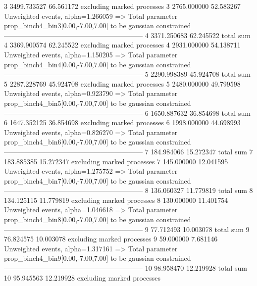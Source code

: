 3          3499.733527     66.561172       excluding marked processes    
3          2765.000000     52.583267       Unweighted events, alpha=1.266059
  => Total parameter prop_binch4_bin3[0.00,-7.00,7.00] to be gaussian constrained
------------------------------------------------------------
4          3371.250683     62.245522       total sum                     
4          3369.900574     62.245522       excluding marked processes    
4          2931.000000     54.138711       Unweighted events, alpha=1.150205
  => Total parameter prop_binch4_bin4[0.00,-7.00,7.00] to be gaussian constrained
------------------------------------------------------------
5          2290.998389     45.924708       total sum                     
5          2287.228769     45.924708       excluding marked processes    
5          2480.000000     49.799598       Unweighted events, alpha=0.923790
  => Total parameter prop_binch4_bin5[0.00,-7.00,7.00] to be gaussian constrained
------------------------------------------------------------
6          1650.887632     36.854698       total sum                     
6          1647.352125     36.854698       excluding marked processes    
6          1998.000000     44.698993       Unweighted events, alpha=0.826270
  => Total parameter prop_binch4_bin6[0.00,-7.00,7.00] to be gaussian constrained
------------------------------------------------------------
7          184.984066      15.272347       total sum                     
7          183.885385      15.272347       excluding marked processes    
7          145.000000      12.041595       Unweighted events, alpha=1.275752
  => Total parameter prop_binch4_bin7[0.00,-7.00,7.00] to be gaussian constrained
------------------------------------------------------------
8          136.060327      11.779819       total sum                     
8          134.125115      11.779819       excluding marked processes    
8          130.000000      11.401754       Unweighted events, alpha=1.046618
  => Total parameter prop_binch4_bin8[0.00,-7.00,7.00] to be gaussian constrained
------------------------------------------------------------
9          77.712493       10.003078       total sum                     
9          76.824575       10.003078       excluding marked processes    
9          59.000000       7.681146        Unweighted events, alpha=1.317161
  => Total parameter prop_binch4_bin9[0.00,-7.00,7.00] to be gaussian constrained
------------------------------------------------------------
10         98.958470       12.219928       total sum                     
10         95.945563       12.219928       excluding marked processes    
